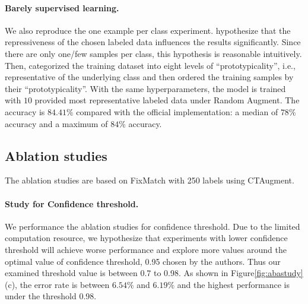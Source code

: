 \paragraph{Barely supervised learning.}
We also reproduce the one example per class experiment.
\citep{sohn2020fixmatch} hypothesize that the repressiveness of the chosen labeled data influences the results significantly. Since there are only one/few samples per class, this hypothesis is reasonable intuitively. Then, \citet{sohn2020fixmatch} categorized the training dataset into eight levels of “prototypicality”, i.e., representative of the underlying class and then ordered the training samples by their “prototypicality”. With the same hyperparameters, the model is trained with $10$ provided most representative labeled data under Random Augment. The accuracy is $84.41\%$ compared with the official implementation: a median of $78\%$ accuracy and a maximum of $84\%$ accuracy. 

\subsection{Ablation studies}
The ablation studies are based on FixMatch with 250 labels using CTAugment. 
\paragraph{Study for Confidence threshold.}
We performance the ablation studies for confidence threshold. Due to the limited computation resource, we hypothesize that experiments with lower confidence threshold will achieve worse performance and explore more values around the optimal value of confidence threshold, 0.95 chosen by the authors. Thus our examined threshold value is between 0.7 to 0.98. As shown in Figure\ref{fig:abastudy} (c), the error rate is between $6.54\%$ and $6.19\%$ and the highest performance is under the threshold 0.98.  

